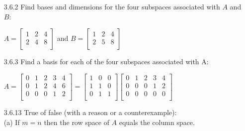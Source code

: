 \documentclass[10pt,twoside,reqno]{article}
\begin{document}
\begin{enumerate}
\item[3.6.2] Find bases and dimensions for the four subspaces associated with $A$ and $B$:\\
\begin{center}
$
$$
A =
\begin{bmatrix}
1&2&4\\
2&4&8\\
\end{bmatrix}
$$
$
and
$
$$
B =
\begin{bmatrix}
1&2&4\\
2&5&8\\
\end{bmatrix}
$$
$
\end{center}
\vspace{3mm}



\item[3.6.3] Find a basis for each of the four subspaces associated with A:\\
\begin{center}
$
$$
A =
\begin{bmatrix}
0&1&2&3&4\\
0&1&2&4&6\\
0&0&0&1&2\\
\end{bmatrix}
=
\begin{bmatrix}
1&0&0\\
1&1&0\\
0&1&1\\
\end{bmatrix}
\begin{bmatrix}
0&1&2&3&4\\
0&0&0&1&2\\
0&0&0&0&0\\
\end{bmatrix}
$$
$
\end{center}
\vspace{3mm}



\item[3.6.13] True of false (with a reason or a counterexample):\\
(a) If $m = n$ then the row space of $A$ equals the column space.\\




\end{enumerate}
\end{document}
